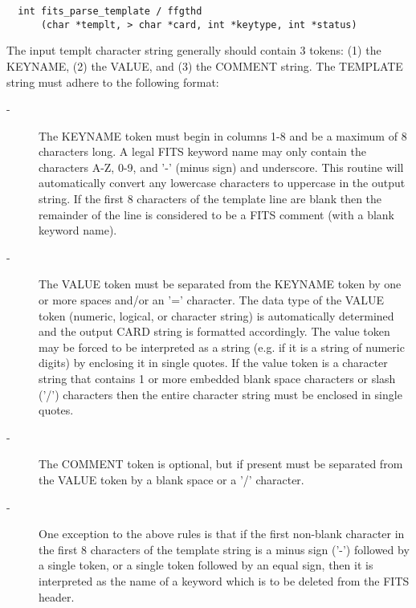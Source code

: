 \documentclass[11pt]{book}
\begin{document}
\begin{verbatim}
  int fits_parse_template / ffgthd
      (char *templt, > char *card, int *keytype, int *status)
\end{verbatim}
    The input templt character string generally should contain 3 tokens:
    (1) the KEYNAME, (2) the VALUE, and (3) the COMMENT string.  The
    TEMPLATE string must adhere to the following format:


\begin{description}
\item[- ]     The KEYNAME token must begin in columns 1-8 and be a maximum  of 8
        characters long.  A legal FITS keyword name may only
        contain the characters A-Z, 0-9, and '-' (minus sign) and
        underscore.  This routine will automatically convert any lowercase
        characters to uppercase in the output string.  If the first 8 characters
        of the template line are
        blank then the remainder of the line is considered to be a FITS comment
       (with a blank keyword name).
\end{description}


\begin{description}
\item[- ]     The VALUE token must be separated from the KEYNAME token by one or more
        spaces and/or an '=' character.  The data type of the VALUE token
        (numeric, logical, or character string) is automatically determined
        and  the output CARD string is formatted accordingly.  The value
        token may be forced to be interpreted as a string (e.g. if it is a
        string of numeric digits) by enclosing it in single quotes.
        If the value token is a character string that contains 1 or more
        embedded blank space characters or slash ('/') characters then the
       entire character string must be enclosed in single quotes.
\end{description}


\begin{description}
\item[- ]     The COMMENT token is optional, but if present must be separated from
       the VALUE token by a blank space or a  '/' character.
\end{description}


\begin{description}
\item[- ]     One exception to the above rules is that if the first non-blank
        character in the first 8 characters of the template string is a
        minus sign ('-') followed
        by a single token, or a single token followed by an equal sign,
        then it is interpreted as the name of a keyword which is to be
       deleted from the FITS header.
\end{description}
\end{document}
